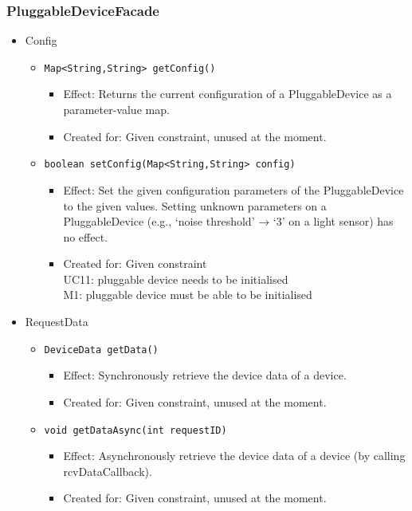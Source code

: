     \subsubsection{PluggableDeviceFacade}
        \begin{itemize}
        	\item Config
        	\begin{itemize}
                \item \texttt{Map<String,String> getConfig()}
                    \begin{itemize}
                        \item Effect: Returns the current configuration of a
                              PluggableDevice as a parameter-value map.
                        \item Created for: Given constraint, unused at the moment.
                    \end{itemize}
                \item \texttt{boolean setConfig(Map<String,String> config)}
                    \begin{itemize}
                        \item Effect: Set the given configuration parameters of the
                              PluggableDevice to the given values. Setting unknown parameters
                              on a PluggableDevice (e.g., ‘noise threshold’ → ‘3’ on a light
                              sensor) has no effect.
                        \item Created for: Given constraint \\
                              UC11: pluggable device needs to be initialised \\
                              M1: pluggable device must be able to be initialised
                    \end{itemize}
        	\end{itemize}

        	\item RequestData
        	\begin{itemize}
                \item \texttt{DeviceData getData()}
                    \begin{itemize}
                        \item Effect: Synchronously retrieve the device data of a device.
                        \item Created for: Given constraint, unused at the moment.
                    \end{itemize}
                \item \texttt{void getDataAsync(int requestID)}
                    \begin{itemize}
                        \item Effect: Asynchronously retrieve the device data
                              of a device (by calling rcvDataCallback).
                        \item Created for: Given constraint, unused at the moment.
                    \end{itemize}
        	\end{itemize}


\end{itemize}
